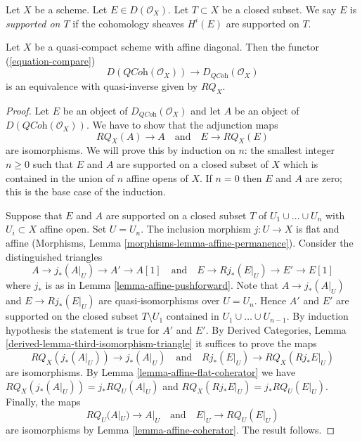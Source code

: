 \begin{definition}
\label{definition-supported-on}
Let $X$ be a scheme. Let $E \in D(\mathcal{O}_X)$.
Let $T \subset X$ be a closed subset.
We say $E$ is {\it supported on $T$} if the
cohomology sheaves $H^i(E)$ are supported on $T$.
\end{definition}

\begin{lemma}
\label{lemma-quasi-compact-affine-diagonal}
Let $X$ be a quasi-compact scheme with affine diagonal.
Then the functor (\ref{equation-compare})
$$
D(\textit{QCoh}(\mathcal{O}_X))
\longrightarrow
D_{\textit{QCoh}}(\mathcal{O}_X)
$$
is an equivalence with quasi-inverse given by $RQ_X$.
\end{lemma}

\begin{proof}
Let $E$ be an object of $D_{\textit{QCoh}}(\mathcal{O}_X)$ and
let $A$ be an object of $D(\textit{QCoh}(\mathcal{O}_X))$.
We have to show that the adjunction maps
$$
RQ_X(A) \to A
\quad\text{and}\quad
E \to RQ_X(E)
$$
are isomorphisms. We will prove this by induction on $n$:
the smallest integer $n \geq 0$ such that $E$ and $A$ are supported
on a closed subset of $X$ which
is contained in the union of $n$ affine opens of $X$. If $n = 0$
then $E$ and $A$ are zero; this is the base case of the induction.

\medskip\noindent
Suppose that $E$ and $A$ are supported on a closed subset $T$ of
$U_1 \cup \ldots \cup U_n$ with $U_i \subset X$ affine open.
Set $U = U_n$. The inclusion morphism
$j : U \to X$ is flat and affine
(Morphisms, Lemma \ref{morphisms-lemma-affine-permanence}).
Consider the distinguished triangles
$$
A \to j_*(A|_U) \to A' \to A[1]
\quad\text{and}\quad
E \to Rj_*(E|_U) \to E' \to E[1]
$$
where $j_*$ is as in Lemma \ref{lemma-affine-pushforward}.
Note that $A \to j_*(A|_U)$ and $E \to Rj_*(E|_U)$ are quasi-isomorphisms
over $U = U_n$. Hence $A'$ and $E'$ are supported on the closed
subset $T \setminus U_1$ contained in $U_1 \cup \ldots \cup U_{n - 1}$.
By induction hypothesis the statement is true for $A'$ and $E'$. By
Derived Categories, Lemma \ref{derived-lemma-third-isomorphism-triangle}
it suffices to prove the maps
$$
RQ_X(j_*(A|_U)) \to j_*(A|_U)
\quad\text{and}\quad
Rj_*(E|_U) \to RQ_X(Rj_*E|_U)
$$
are isomorphisms. By Lemma \ref{lemma-affine-flat-coherator} we have
$RQ_X(j_*(A|_U)) = j_*RQ_U(A|_U)$ and
$RQ_X(Rj_*E|_U) = j_*RQ_U(E|_U)$. Finally, the maps
$$
RQ_U(A|_U) \to A|_U
\quad\text{and}\quad
E|_U \to RQ_U(E|_U)
$$
are isomorphisms by Lemma \ref{lemma-affine-coherator}. The result follows.
\end{proof}




